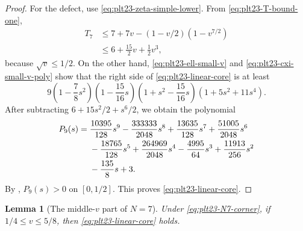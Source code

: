 \documentclass[11pt]{article}
\newtheorem{lemma}[theorem]{Lemma}
\numberwithin{equation}{section}
\begin{document}
\begin{proof}
  For the defect, use \eqref{eq:plt23-zeta-simple-lower}.
  From \eqref{eq:plt23-T-bound-one},
  \begin{align*}
    T_7
    &\le7+7v-(1-v/2)(1-v^{7/2})\\
    &\le6+\frac{15}{2}v+\frac{1}{2}v^3,
  \end{align*}
  because $\sqrt v\le1/2$.
  On the other hand, \eqref{eq:plt23-ell-small-v} and \eqref{eq:plt23-cxi-small-v-poly} show that the right side of \eqref{eq:plt23-linear-core} is at least
  \[
    9\left(1-\frac{7}{8}s^2\right)
    \left(1-\frac{15}{16}s\right)
    \left(1+s^2-\frac{15}{16}s\right)
    (1+5s^2+11s^4).
  \]
  After subtracting $6+15s^2/2+s^6/2$, we obtain the polynomial
  \begin{align}
    P_9(s)={}&\frac{10395}{128}s^9-\frac{333333}{2048}s^8
    +\frac{13635}{128}s^7+\frac{51005}{2048}s^6 \notag\\
    &-\frac{18765}{128}s^5+\frac{264969}{2048}s^4
    -\frac{4995}{64}s^3+\frac{11913}{256}s^2 \notag\\
    &-\frac{135}{8}s+3. \label{eq:plt23-P9-small}
  \end{align}
  By , $P_9(s)>0$ on $[0,1/2]$.
  This proves \eqref{eq:plt23-linear-core}.
\end{proof}

\begin{lemma}[The middle-$v$ part of $N=7$]\label{lem:plt23-N7-middle-v}
  Under \eqref{eq:plt23-N7-corner}, if $1/4\le v\le5/8$, then \eqref{eq:plt23-linear-core} holds.
\end{lemma}
\end{document}
